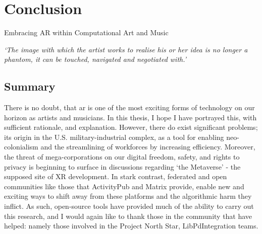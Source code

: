\chapter{Conclusion}{Embracing AR within Computational Art and Music}
\label{sec: conclusion}
\epigraph{\textit{`The image with which the artist works to realise his or her idea is no longer a phantom, it can be touched, navigated and negotiated with.'}}{\citep[p.5]{ryan1991}}


\clearpage

\section{Summary}\label{sec: conclusion-summary}
There is no doubt, that \gls{ar} is one of the most exciting forms of technology on our horizon as artists and musicians. In this thesis, I hope I have portrayed this, with sufficient rationale, and explanation. However, there do exist significant problems; its origin in the U.S. military-industrial complex, as a tool for enabling neo-colonialism and the streamlining of workforces by increasing efficiency. Moreover, the threat of mega-corporations on our digital freedom, safety, and rights to privacy is beginning to surface in discussions regarding `the Metaverse' - the supposed site of XR development. In stark contrast, federated and open communities like those that ActivityPub and Matrix provide, enable new and exciting ways to shift away from these platforms and the algorithmic harm they inflict. As such, open-source tools have provided much of the ability to carry out this research, and I would again like to thank those in the community that have helped: namely those involved in the Project North Star, LibPdIntegration teams.


